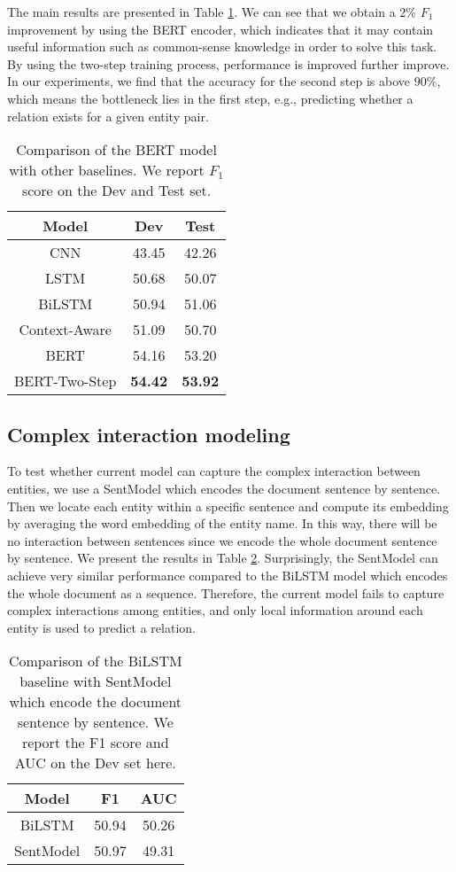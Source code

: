 \documentclass[11pt,a4paper]{article}
\begin{document}
The main results are presented in Table \ref{tab:result}. We can see that we obtain a $2\%$ $F_1$ improvement by using the BERT encoder, which indicates that it may contain useful information such as common-sense knowledge in order to solve this task. By using the two-step training process, performance is improved further improve. In our experiments, we find that the accuracy for the second step is above $90\%$, which means the bottleneck lies in the first step, e.g., predicting whether a relation exists for a given entity pair.

\begin{table}[]
    \centering
    \begin{tabular}{c|c|c}\toprule
         Model & Dev & Test  \\\midrule
         CNN & 43.45 & 42.26\\
         LSTM & 50.68 & 50.07 \\
         BiLSTM & 50.94 & 51.06\\
         Context-Aware & 51.09 & 50.70\\\midrule
         BERT & 54.16 & 53.20 \\
         BERT-Two-Step & \bf 54.42 & \bf 53.92 \\\bottomrule
    \end{tabular}
    \caption{Comparison of the BERT model with other baselines. We report $F_1$ score on the Dev and Test set.}
    \label{tab:result}
\end{table}{}

\subsection{Complex interaction modeling}
To test whether current model can capture the complex interaction between entities, we use a SentModel which encodes the document sentence by sentence. Then we locate each entity within a specific sentence and compute its embedding by averaging the word embedding of the entity name. 
In this way, there will be no interaction between sentences since we encode the whole document sentence by sentence. We present the results in Table \ref{tab:sent}. Surprisingly, the SentModel can achieve very similar performance compared to the BiLSTM model which encodes the whole document as a sequence. Therefore, the current model fails to capture complex interactions among entities, and only local information around each entity is used to predict a relation.

\begin{table}[]
    \centering
    \begin{tabular}{c|c|c}\toprule
        Model & F1 & AUC \\\midrule
        BiLSTM & 50.94 & 50.26\\
        SentModel & 50.97 & 49.31 \\\bottomrule
    \end{tabular}
    \caption{Comparison of the BiLSTM baseline with SentModel which encode the document sentence by sentence. We report the F1 score and AUC on the Dev set here.}
    \label{tab:sent}
\end{table}{}
\end{document}

